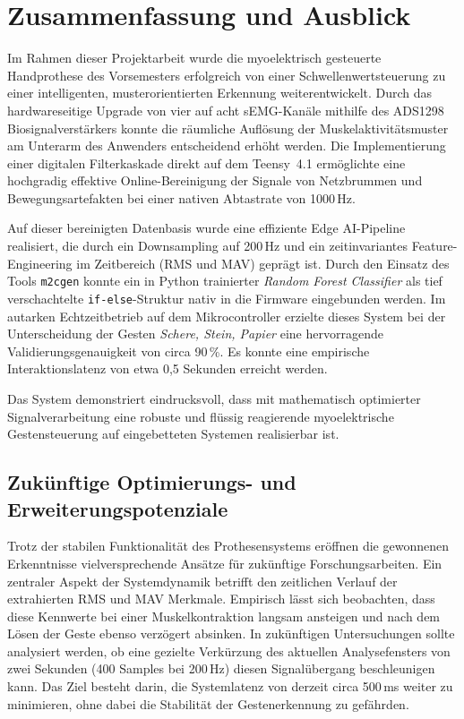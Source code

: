 \section{Zusammenfassung und Ausblick}
\label{sec:ausblick}
Im Rahmen dieser Projektarbeit wurde die myoelektrisch gesteuerte Handprothese des Vorsemesters erfolgreich von einer Schwellenwertsteuerung zu einer intelligenten, musterorientierten Erkennung weiterentwickelt. Durch das hardwareseitige Upgrade von vier auf acht \ac{sEMG}-Kanäle mithilfe des \textsf{ADS1298} Biosignalverstärkers konnte die räumliche Auflösung der Muskelaktivitätsmuster am Unterarm des Anwenders entscheidend erhöht werden. Die Implementierung einer digitalen Filterkaskade direkt auf dem \textsf{Teensy~4.1} ermöglichte eine hochgradig effektive Online-Bereinigung der Signale von Netzbrummen und Bewegungsartefakten bei einer nativen Abtastrate von 1000\,Hz.

Auf dieser bereinigten Datenbasis wurde eine effiziente Edge AI-Pipeline realisiert, die durch ein Downsampling auf 200\,Hz und ein zeitinvariantes Feature-Engineering im Zeitbereich (\ac{RMS} und \ac{MAV}) geprägt ist. Durch den Einsatz des Tools \texttt{m2cgen} konnte ein in Python trainierter \textit{Random Forest Classifier} als tief verschachtelte \texttt{if-else}-Struktur nativ in die Firmware eingebunden werden. Im autarken Echtzeitbetrieb auf dem Mikrocontroller erzielte dieses System bei der Unterscheidung der Gesten \textit{Schere, Stein, Papier} eine hervorragende Validierungsgenauigkeit von circa 90\,\%. Es konnte eine empirische Interaktionslatenz von etwa 0,5 Sekunden erreicht werden.

Das System demonstriert eindrucksvoll, dass mit mathematisch optimierter Signalverarbeitung eine robuste und flüssig reagierende myoelektrische Gestensteuerung auf eingebetteten Systemen realisierbar ist.

    \subsection{Zukünftige Optimierungs- und Erweiterungspotenziale}
    Trotz der stabilen Funktionalität des Prothesensystems eröffnen die gewonnenen Erkenntnisse vielversprechende Ansätze für zukünftige Forschungsarbeiten. Ein zentraler Aspekt der Systemdynamik betrifft den zeitlichen Verlauf der extrahierten \ac{RMS} und \ac{MAV} Merkmale. Empirisch lässt sich beobachten, dass diese Kennwerte bei einer Muskelkontraktion langsam ansteigen und nach dem Lösen der Geste ebenso verzögert absinken. In zukünftigen Untersuchungen sollte analysiert werden, ob eine gezielte Verkürzung des aktuellen Analysefensters von zwei Sekunden (400 Samples bei 200\,Hz) diesen Signalübergang beschleunigen kann. Das Ziel besteht darin, die Systemlatenz von derzeit circa 500\,ms weiter zu minimieren, ohne dabei die Stabilität der Gestenerkennung zu gefährden.

